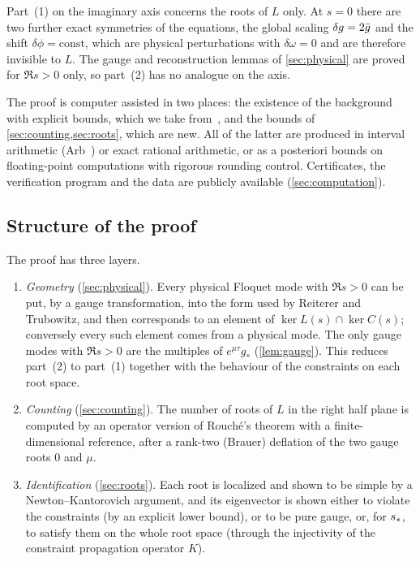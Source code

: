 \begin{remark}\label{rem:neutral}
Part~(1) on the imaginary axis concerns the roots of $L$ only. At $s=0$ there are two further exact
symmetries of the equations, the global scaling $\delta g=2\bar g$ and the shift $\delta\phi=\mathrm{const}$,
which are physical perturbations with $\delta\omega=0$ and are therefore invisible to $L$. The gauge and
reconstruction lemmas of \cref{sec:physical} are proved for $\Re s>0$ only, so part~(2) has no analogue on
the axis.
\end{remark}

\begin{remark}\label{rem:computation}
The proof is computer assisted in two places: the existence of the background with explicit bounds, which
we take from~\cite{RT2019}, and the bounds of \cref{sec:counting,sec:roots}, which are new. All of the
latter are produced in interval arithmetic (Arb~\cite{Arb}) or exact rational arithmetic, or as a posteriori
bounds on floating-point computations with rigorous rounding control. Certificates, the verification
program and the data are publicly available (\cref{sec:computation}).
\end{remark}

\subsection{Structure of the proof}\label{sec:main-structure}
The proof has three layers.
\begin{enumerate}[label=(\roman*),leftmargin=*]
\item \emph{Geometry} (\cref{sec:physical}). Every physical Floquet mode with $\Re s>0$ can be put, by a
  gauge transformation, into the form used by Reiterer and Trubowitz, and then corresponds to an element of
  $\ker L(s)\cap\ker C(s)$; conversely every such element comes from a physical mode. The only gauge modes
  with $\Re s>0$ are the multiples of $e^{\mu\tau}g_*$ (\cref{lem:gauge}). This reduces
  part~(2) to part~(1) together with the behaviour of the constraints on each root space.
\item \emph{Counting} (\cref{sec:counting}). The number of roots of $L$ in the right half plane is
  computed by an operator version of Rouch\'e's theorem with a finite-dimensional reference, after a
  rank-two (Brauer) deflation of the two gauge roots $0$ and $\mu$.
\item \emph{Identification} (\cref{sec:roots}). Each root is localized and shown to be simple by a
  Newton--Kantorovich argument, and its eigenvector is shown either to violate the constraints (by an
  explicit lower bound), or to be pure gauge, or, for $s_{\ast}$, to satisfy them on the whole root space
  (through the injectivity of the constraint propagation operator $K$).
\end{enumerate}
